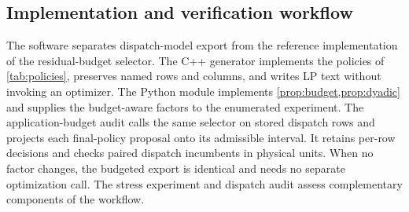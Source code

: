 \subsection{Implementation and verification workflow}
\label{sec:implementation}
The software separates dispatch-model export from the reference implementation of the
residual-budget selector. The C++ generator implements the policies of
\cref{tab:policies}, preserves named rows and columns, and writes LP text without invoking
an optimizer. The Python module  implements
\cref{prop:budget,prop:dyadic} and supplies the budget-aware factors to the enumerated
experiment. The application-budget audit calls the same selector on stored dispatch rows and
projects each final-policy proposal onto its admissible interval. It retains per-row
decisions and checks paired dispatch incumbents in physical units. When no factor changes,
the budgeted export is identical and needs no separate optimization call. The stress
experiment and dispatch audit assess complementary components of the workflow.

